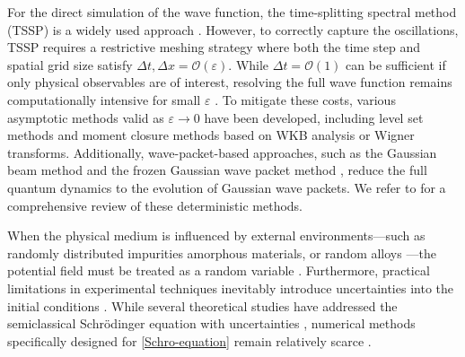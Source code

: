 \documentclass[preprint,11pt]{elsarticle}
\begin{document}
For the direct simulation of the wave function, the time-splitting spectral method (TSSP) is a widely used approach \cite{baoTimeSplittingSpectralApproximations2002}. However, to correctly capture the oscillations, TSSP requires a restrictive meshing strategy where both the time step and spatial grid size satisfy $\Delta t, \Delta x = \mathcal{O}(\varepsilon)$. While $\Delta t = \mathcal{O}(1)$ can be sufficient if only physical observables are of interest, resolving the full wave function remains computationally intensive for small $\varepsilon$ \cite{golseConvergenceTimeSplitting2019}. To mitigate these costs, various asymptotic methods valid as $\varepsilon \to 0$ have been developed, including level set methods \cite{jinComputationSemiclassicalLimit} and moment closure methods based on WKB analysis or Wigner transforms. Additionally, wave-packet-based approaches, such as the Gaussian beam method %
\cite{huangGaussianBeamMethods2012,jinBlochDecompositionbasedGaussian2010,jinGaussianBeamMethods2014}
and the frozen Gaussian wave packet method %
\cite{chaiFrozenGaussianApproximation2019,luFrozenGaussianApproximation,luFrozenGaussianApproximation2011,xieFrozenGaussianSampling2021a},
reduce the full quantum dynamics to the evolution of Gaussian wave packets. We refer to \cite{jinMathematicalComputationalMethods2011,lasserComputingQuantumDynamics2020} for a comprehensive review of these deterministic methods.

When the physical medium is influenced by external environments—such as randomly distributed impurities %
\cite{avishai1992electron,fisher1991directed}
amorphous materials, or random alloys %
\cite{johnson1986density,leschke2005survey}
—the potential field must be treated as a random variable \cite{anderson1958absence,roati2008anderson}. Furthermore, practical limitations in experimental techniques inevitably introduce uncertainties into the initial conditions \cite{jinGaussianWavePacket2020}. While several theoretical studies have addressed the semiclassical Schrödinger equation with uncertainties \cite{gerard1997homogenization,hagedorn1998raising,lee1982exact,xiu2002wiener,zhou2014numerical}, numerical methods specifically designed for \eqref{Schro-equation} remain relatively scarce \cite{gunzburger2014stochastic}.
\end{document}
